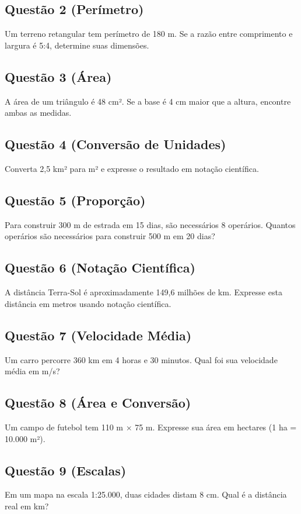 \documentclass[11pt]{extarticle} %
\begin{document}
\begin{multicols}{2}
\subsection*{Questão 2 (Perímetro)}
Um terreno retangular tem perímetro de 180 m. Se a razão entre comprimento e largura é 5:4, determine suas dimensões.

\subsection*{Questão 3 (Área)}
A área de um triângulo é 48 cm². Se a base é 4 cm maior que a altura, encontre ambas as medidas.

\subsection*{Questão 4 (Conversão de Unidades)}
Converta 2,5 km² para m² e expresse o resultado em notação científica.

\subsection*{Questão 5 (Proporção)}
Para construir 300 m de estrada em 15 dias, são necessários 8 operários. Quantos operários são necessários para construir 500 m em 20 dias?

\subsection*{Questão 6 (Notação Científica)}
A distância Terra-Sol é aproximadamente 149,6 milhões de km. Expresse esta distância em metros usando notação científica.

\subsection*{Questão 7 (Velocidade Média)}
Um carro percorre 360 km em 4 horas e 30 minutos. Qual foi sua velocidade média em m/s?

\subsection*{Questão 8 (Área e Conversão)}
Um campo de futebol tem 110 m × 75 m. Expresse sua área em hectares (1 ha = 10.000 m²).

\subsection*{Questão 9 (Escalas)}
Em um mapa na escala 1:25.000, duas cidades distam 8 cm. Qual é a distância real em km?


\end{multicols}
\end{document}
